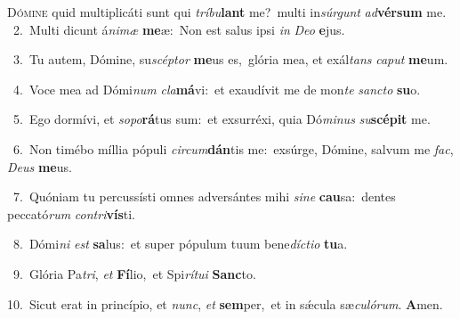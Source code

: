 \lettrine{\initial\textcolor{\initialcolor}{D}}{ómine} quid multiplicáti sunt qui \textit{trí}\-\textit{bu}\textbf{lant} me?~\star multi in\-\textit{súr}\-\textit{gunt} \textit{ad}\-\textbf{vér}\textbf{sum} me.\\
{\numbfont\textcolor{\numbcolor}{~2.}}~Multi dicunt á\-\textit{ni}\-\textit{mæ} \textbf{me}\-æ:~\star Non est salus ipsi \textit{in} \textit{De}\-\textit{o} \textbf{e}\-jus.\par
{\numbfont\textcolor{\numbcolor}{~3.}}~Tu autem, Dómine, su\-\textit{scép}\-\textit{tor} \textbf{me}\-us es,~\star glória mea, et exál\textit{tans} \textit{ca}\-\textit{put} \textbf{me}\-um.\par
{\numbfont\textcolor{\numbcolor}{~4.}}~Voce mea ad Dómi\textit{num} \textit{cla}\-\textbf{má}vi:~\star et exaudívit me de mon\textit{te} \textit{sanc}\-\textit{to} \textbf{su}\-o.\par
{\numbfont\textcolor{\numbcolor}{~5.}}~Ego dormívi, et \textit{so}\-\textit{po}\textbf{rá}tus sum:~\star et exsurréxi, quia Dó\-\textit{mi}\-\textit{nus} \textit{su}\-\textbf{scé}\textbf{pit} me.\par
{\numbfont\textcolor{\numbcolor}{~6.}}~Non timébo míllia pópuli \textit{cir}\-\textit{cum}\textbf{dán}tis me:~\star exsúrge, Dómine, salvum me \textit{fac}\-, \textit{De}\-\textit{us} \textbf{me}\-us.\par
{\numbfont\textcolor{\numbcolor}{~7.}}~Quóniam tu percussísti omnes adversántes mihi \textit{si}\-\textit{ne} \textbf{cau}\-sa:~\star dentes peccató\textit{rum} \textit{con}\-\textit{tri}\textbf{vís}ti.\par
{\numbfont\textcolor{\numbcolor}{~8.}}~Dómi\textit{ni} \textit{est} \textbf{sa}\-lus:~\star et super pópulum tuum bene\-\textit{díc}\-\textit{ti}\textit{o} \textbf{tu}\-a.\par
{\numbfont\textcolor{\numbcolor}{~9.}}~Glória Pa\-\textit{tri}\-, \textit{et} \textbf{Fí}\-lio,~\star et Spi\-\textit{rí}\-\textit{tu}\textit{i} \textbf{Sanc}\-to.\par
{\numbfont\textcolor{\numbcolor}{10.}}~Sicut erat in princípio, et \textit{nunc}\-, \textit{et} \textbf{sem}\-per,~\star et in sǽcula sæ\-\textit{cu}\-\textit{ló}\textit{rum}. \textbf{A}\-men.\par
